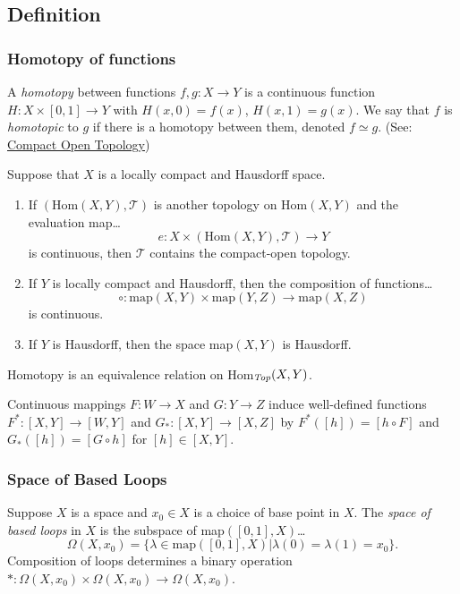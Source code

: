 \subsection{Definition}\label{homotopydefinition}

\subsubsection{Homotopy of functions}\label{functionhomotopy}
A \emph{homotopy} between functions $f,g: X \rightarrow Y$ is a continuous function $H : X \times [0,1] \rightarrow Y$ with $H(x,0) = f(x)$,
$H(x,1) = g(x)$. We say that $f$ is \emph{homotopic} to $g$ if there is a homotopy between them, denoted $f \simeq g$.
(See: \hyperref[compactopentopology]{Compact Open Topology})

\begin{proposition}
Suppose that $X$ is a locally compact and Hausdorff space.
\begin{enumerate}
  \item If $(\textrm{Hom}(X,Y),\mathcal{T})$ is another topology on Hom$(X,Y)$ and the evaluation map\dots
  $$e: X \times (\textrm{Hom}(X,Y),\mathcal{T}) \rightarrow Y$$
  is continuous, then $\mathcal{T}$ contains the compact-open topology.
  \item If $Y$ is locally compact and Hausdorff, then the composition of functions\dots
  $$\circ : \textrm{map}(X,Y) \times \textrm{map}(Y,Z) \rightarrow \textrm{map}(X,Z)$$
  is continuous.
  \item If $Y$ is Hausdorff, then the space map$(X,Y)$ is Hausdorff.
\end{enumerate}
\end{proposition}

\begin{theorem}
Homotopy is an equivalence relation on Hom$_{\emph{Top}}(X,Y)$.
\end{theorem}

\begin{proposition}
Continuous mappings $F:W \rightarrow X$ and $G: Y \rightarrow Z$ induce well-defined functions $F^* : [X,Y] \rightarrow [W,Y]$ and $G_* : [X,Y] \rightarrow [X,Z]$
by $F^*([h]) = [h \circ F]$ and $G_*([h]) = [G \circ h]$ for $[h] \in [X,Y]$.
\end{proposition}

\subsubsection{Space of Based Loops}\label{spaceofbasedloops}
Suppose $X$ is a space and $x_0 \in X$ is a choice of base point in $X$. The \emph{space of based loops}
in $X$ is the subspace of map$([0,1],X)$\dots
$$\Omega(X,x_0) = \{ \lambda \in \textrm{map}([0,1], X) | \lambda(0) = \lambda(1) = x_0 \}.$$
Composition of loops determines a binary operation $*: \Omega(X,x_0) \times \Omega(X,x_0) \rightarrow \Omega(X,x_0)$.

